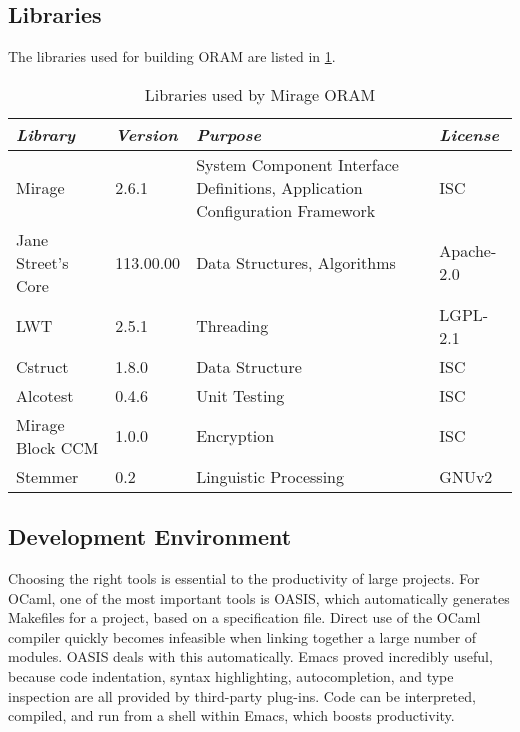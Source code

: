 \documentclass[12pt,a4paper,twoside,openright]{report}
\begin{document}
\subsection{Libraries}
\label{subsec:libraries}

The libraries used for building ORAM are listed in \cref{tab:libraries}.

\begin{table}[h]
\centering
\begin{tabularx}{\textwidth}{|l|l|X|l|}
\hline
\textit{Library} & \textit{Version} & \textit{Purpose} & \textit{License} \\
\hline \hline
Mirage & 2.6.1 & System Component Interface Definitions, Application Configuration Framework & ISC \\
\hline
Jane Street's Core & 113.00.00 & Data Structures, Algorithms & Apache-2.0 \\
\hline
LWT & 2.5.1 & Threading & LGPL-2.1 \\
\hline
Cstruct & 1.8.0 & Data Structure & ISC \\
\hline
Alcotest & 0.4.6 & Unit Testing & ISC \\
\hline
Mirage Block CCM & 1.0.0 & Encryption & ISC \\
\hline
Stemmer & 0.2 & Linguistic Processing & GNUv2 \\
\hline
\end{tabularx}
\caption{Libraries used by Mirage ORAM}
\label{tab:libraries}
\end{table}

\subsection{Development Environment}

Choosing the right tools is essential to the productivity of large projects. For OCaml, one of the most important tools is OASIS, which automatically generates Makefiles for a project, based on a specification file. Direct use of the OCaml compiler quickly becomes infeasible when linking together a large number of modules. OASIS deals with this automatically.
Emacs proved incredibly useful, because code indentation, syntax highlighting, autocompletion, and type inspection are all provided by third-party plug-ins. Code can be interpreted, compiled, and run from a shell within Emacs, which boosts productivity.
\end{document}
